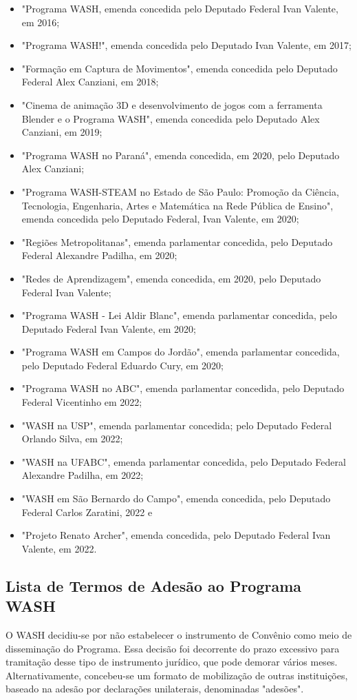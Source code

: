 \begin{itemize}
\item "Programa WASH, emenda concedida pelo Deputado Federal Ivan Valente, em 2016;
\item "Programa WASH!", emenda concedida pelo Deputado Ivan Valente, em 2017;
\item "Formação em Captura de Movimentos", emenda concedida pelo Deputado Federal Alex Canziani, em 2018;
\item "Cinema de animação 3D e desenvolvimento de jogos com a ferramenta Blender e o Programa WASH", emenda concedida pelo Deputado Alex Canziani, em 2019;
\item "Programa WASH no Paraná", emenda concedida, em 2020, pelo Deputado Alex Canziani;
\item "Programa WASH-STEAM no Estado de São Paulo: Promoção da Ciência, Tecnologia, Engenharia, Artes  e Matemática na Rede Pública de Ensino", emenda concedida pelo Deputado Federal, Ivan Valente, em 2020;
\item "Regiões Metropolitanas", emenda parlamentar concedida, pelo Deputado Federal Alexandre Padilha, em 2020;
\item "Redes de Aprendizagem", emenda concedida, em 2020, pelo Deputado Federal Ivan Valente;
\item "Programa WASH - Lei Aldir Blanc", emenda parlamentar concedida, pelo Deputado Federal  Ivan Valente, em 2020;
\item "Programa WASH em Campos do Jordão", emenda parlamentar concedida, pelo Deputado Federal Eduardo Cury, em 2020;
\item "Programa WASH no ABC", emenda parlamentar concedida, pelo Deputado Federal Vicentinho em 2022;
\item "WASH na USP", emenda parlamentar concedida; pelo Deputado Federal Orlando Silva, em 2022;
\item "WASH na UFABC", emenda parlamentar concedida, pelo Deputado Federal Alexandre Padilha, em 2022;
\item "WASH em São Bernardo do Campo", emenda concedida, pelo Deputado Federal Carlos Zaratini, 2022 e
\item "Projeto Renato Archer", emenda concedida, pelo Deputado Federal Ivan Valente, em 2022.
\end{itemize}

\subsection[Lista de Termos de Adesão ao Programa WASH]{Lista de Termos de Adesão ao Programa WASH}\label{Lista de Termos de Adesão ao Programa WASH}
O WASH decidiu-se por não estabelecer o instrumento de Convênio como meio de disseminação do Programa. Essa decisão foi decorrente do prazo excessivo para tramitação desse tipo de instrumento jurídico, que pode demorar vários meses. Alternativamente, concebeu-se um formato de mobilização de outras instituições, baseado na adesão por declarações  unilaterais, denominadas "adesões".

